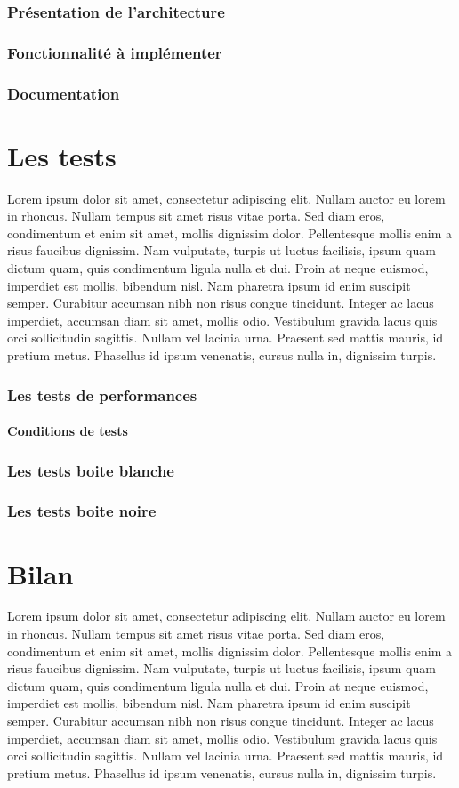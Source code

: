 \documentclass[12pt]{article}
\begin{document}
	\section{Présentation de l'architecture}
	\section{Fonctionnalité à implémenter}
	\section{Documentation}

\part{Les tests}
Lorem ipsum dolor sit amet, consectetur adipiscing elit. Nullam auctor eu lorem in rhoncus. Nullam tempus sit amet risus vitae porta. Sed diam eros, condimentum et enim sit amet, mollis dignissim dolor. Pellentesque mollis enim a risus faucibus dignissim. Nam vulputate, turpis ut luctus facilisis, ipsum quam dictum quam, quis condimentum ligula nulla et dui. Proin at neque euismod, imperdiet est mollis, bibendum nisl. Nam pharetra ipsum id enim suscipit semper. Curabitur accumsan nibh non risus congue tincidunt. Integer ac lacus imperdiet, accumsan diam sit amet, mollis odio. Vestibulum gravida lacus quis orci sollicitudin sagittis. Nullam vel lacinia urna. Praesent sed mattis mauris, id pretium metus. Phasellus id ipsum venenatis, cursus nulla in, dignissim turpis.
	\section{Les tests de performances}
		\subsection{Conditions de tests}
	\section{Les tests boite blanche}
	\section{Les tests boite noire}

\part{Bilan}
Lorem ipsum dolor sit amet, consectetur adipiscing elit. Nullam auctor eu lorem in rhoncus. Nullam tempus sit amet risus vitae porta. Sed diam eros, condimentum et enim sit amet, mollis dignissim dolor. Pellentesque mollis enim a risus faucibus dignissim. Nam vulputate, turpis ut luctus facilisis, ipsum quam dictum quam, quis condimentum ligula nulla et dui. Proin at neque euismod, imperdiet est mollis, bibendum nisl. Nam pharetra ipsum id enim suscipit semper. Curabitur accumsan nibh non risus congue tincidunt. Integer ac lacus imperdiet, accumsan diam sit amet, mollis odio. Vestibulum gravida lacus quis orci sollicitudin sagittis. Nullam vel lacinia urna. Praesent sed mattis mauris, id pretium metus. Phasellus id ipsum venenatis, cursus nulla in, dignissim turpis.
\end{document}

